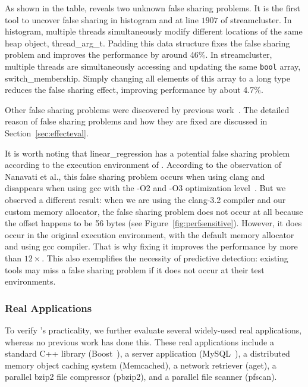 As shown in the table, \Predator{} reveals two unknown false sharing problems. It is the first tool to uncover false sharing in histogram and at line $1907$ of streamcluster. 
In histogram, multiple threads simultaneously modify different locations of the same heap object, thread\_arg\_t. 
Padding this data structure fixes the false sharing problem and improves the performance by around 46\%. In streamcluster, multiple threads are simultaneously accessing and updating the same \texttt{bool} array, switch\_membership. Simply changing all elements of this array to a long type reduces the false sharing effect, improving performance by about 4.7\%.

Other false sharing problems were discovered by previous work~\cite{sheriff}. The detailed reason of false sharing problems and how they are fixed are discussed in Section~\ref{sec:effecteval}.

It is worth noting that linear\_regression has a potential false sharing problem according to the execution environment of \Predator{}. According to the observation of Nanavati et al., this false sharing problem occurs when using clang and disappears when using gcc with the -O2 and -O3 optimization level~\cite{OSdetection}. But we observed a different result: when we are using the clang-3.2 compiler and our custom memory allocator, the false sharing problem does not occur at all because the offset happens to be 56 bytes (see Figure~\ref{fig:perfsensitive}). 
However, it does occur in the original execution environment, with the default memory allocator and using gcc compiler. That is why fixing it improves the performance by more than $12\times$.  This also exemplifies the necessity of \Predator{} predictive detection: existing tools may miss a false sharing problem if it does not occur at their test environments. 
 
\subsubsection{Real Applications}
To verify \Predator{}'s practicality, we further evaluate several widely-used real applications, whereas no previous work has done this. These real applications include a standard C++ library (Boost~\cite{libfalsesharing}), a server application (MySQL~\cite{mysql}), a distributed memory object caching system (Memcached), a network retriever (aget),
a parallel bzip2 file compressor (pbzip2), and a parallel file scanner (pfscan).

